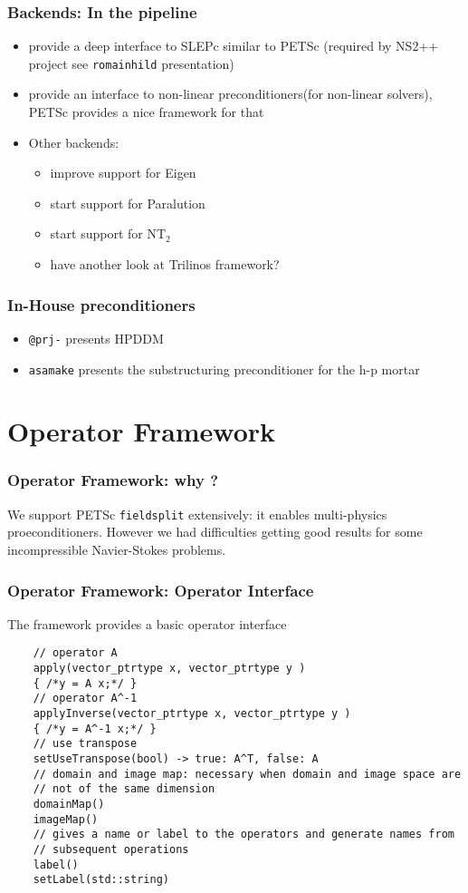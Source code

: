\begin{frame}[fragile]
  \frametitle{Backends: In the pipeline}
  \begin{itemize}
  \item provide a deep interface to SLEPc similar to PETSc (required by
    NS2++ project see \verb+romainhild+ presentation)
  \item provide an interface to non-linear preconditioners(for
    non-linear solvers), PETSc provides a nice framework for that
  \item Other backends:
    \begin{itemize}
    \item improve support for \alert{Eigen}
    \item start support for \alert{Paralution}
    \item start support for \alert{NT$_2$}
    \item have another look at Trilinos framework?
    \end{itemize}
  \end{itemize}
\end{frame}

\begin{frame}[fragile]
  \frametitle{In-House preconditioners}
  \begin{itemize}
  \item \verb+@prj-+ presents HPDDM
  \item \verb+asamake+ presents the substructuring preconditioner for
    the h-p mortar
  \end{itemize}
\end{frame}

\section{Operator Framework}
\begin{frame}
  \frametitle{Operator Framework: why ?}
  We support PETSc \texttt{fieldsplit} extensively: it enables
  multi-physics proeconditioners. However we had difficulties getting
  good results for some incompressible Navier-Stokes problems.

  \centering
  \vfill\vspace{1em}\vfill
\end{frame}

\begin{frame}[fragile]
  \frametitle{Operator Framework: Operator Interface}
  The framework provides a basic operator interface
  \begin{verbatim}
    // operator A
    apply(vector_ptrtype x, vector_ptrtype y )
    { /*y = A x;*/ }
    // operator A^-1
    applyInverse(vector_ptrtype x, vector_ptrtype y )
    { /*y = A^-1 x;*/ }
    // use transpose
    setUseTranspose(bool) -> true: A^T, false: A
    // domain and image map: necessary when domain and image space are
    // not of the same dimension
    domainMap()
    imageMap()
    // gives a name or label to the operators and generate names from
    // subsequent operations
    label()
    setLabel(std::string)
  \end{verbatim}
\end{frame}

